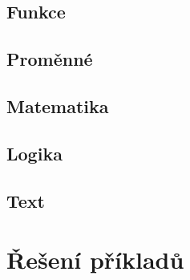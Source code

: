 \subsection*{Funkce }
\begin{itemize}
	\blockFunctionDefinition
	\blockFunctionCall
\end{itemize}

\subsection*{Proměnné }
\begin{itemize}
	\blockVariableCreate
	\blockVariableChange
	\blockVariableGet
	\blockVariableSet
\end{itemize}

\subsection*{Matematika }
\begin{itemize}
	\blockMathOperation
	\blockMathTest
	\blockMathValue
	\blockMathConstant
	\blockMathRandom
\end{itemize}

\subsection*{Logika }
\begin{itemize}
	\blockLogicTrue
	\blockLogicFalse
	\blockLogicIf
	\blockLogicIfElse
	\blockLogicComparison
	\blockLogicOperator
\end{itemize}

\subsection*{Text }
\begin{itemize}
	\blockString
	\blockDisplayPrint
	\blockDisplayClear
\end{itemize}

\newpage

\section{Řešení příkladů}\label{cha:sol}

\printsolutions

\newpage

\nocite{*}
\printbibliography[title={Seznam použitých a doporučených zdrojů}]

